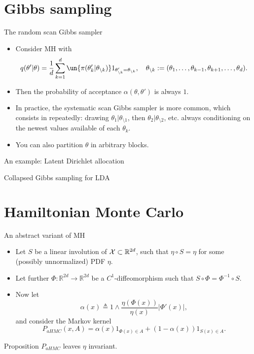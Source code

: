 \documentclass[10pt]{beamer}
\begin{document}
\section{Gibbs sampling}
\begin{frame}{The random scan Gibbs sampler}
\begin{itemize}
\item Consider MH with
$$
q(\theta'\vert\theta) = \frac1d \sum_{k=1}^d \un{\pi(\theta'_k\vert \theta_{\setminus k})} 1_{\theta'_{\setminus k} = \theta_{\setminus k}}, \quad \theta_{\setminus k}:= (\theta_1,\dots,\theta_{k-1},\theta_{k+1},\dots,\theta_d).
$$
\item Then the probability of acceptance $\alpha(\theta,\theta')$ is always $1$.
$$$$
\vfill
\item In practice, the systematic scan Gibbs sampler is more common, which consists in repeatedly: drawing $\theta_1\vert\theta_{\setminus 1}$, then $\theta_2\vert\theta_{\setminus 2}$, etc. always conditioning on the newest values available of each $\theta_k$.
\item You can also partition $\theta$ in arbitrary blocks.
\end{itemize}
\end{frame}

\begin{frame}{An example: Latent Dirichlet allocation}

\end{frame}

\begin{frame}{Collapsed Gibbs sampling for LDA}

\end{frame}

\section{Hamiltonian Monte Carlo}

\begin{frame}{An abstract variant of MH}
\begin{itemize}
  \item Let $S$ be a linear involution of $\mathcal{X}\subset\mathbb{R}^{2d}$, such that $\eta\circ S = \eta$ for some (possibly unnormalized) PDF $\eta$.
  \item Let further $\Phi:\mathbb{R}^{2d}\rightarrow \mathbb{R}^{2d}$ be a $C^1$-diffeomorphism such that $S\circ \Phi = \Phi^{-1}\circ S$.
  \item Now let 
\begin{equation}
    \label{e:acceptance_probability_abstract_HMC}
    \alpha(x) \triangleq 1\wedge \frac{\eta(\Phi(x))}{\eta(x)} \vert\Phi'(x)\vert,
\end{equation}
and consider the Markov kernel
$$
P_{aHMC}(x,A) = \alpha(x) 1_{\Phi(x)\in A} + (1-\alpha(x))1_{S(x)\in A}.
$$
\end{itemize}
\begin{block}{Proposition}
$P_{aHMC}$ leaves $\eta$ invariant.
\end{block}
\end{frame}
\end{document}
